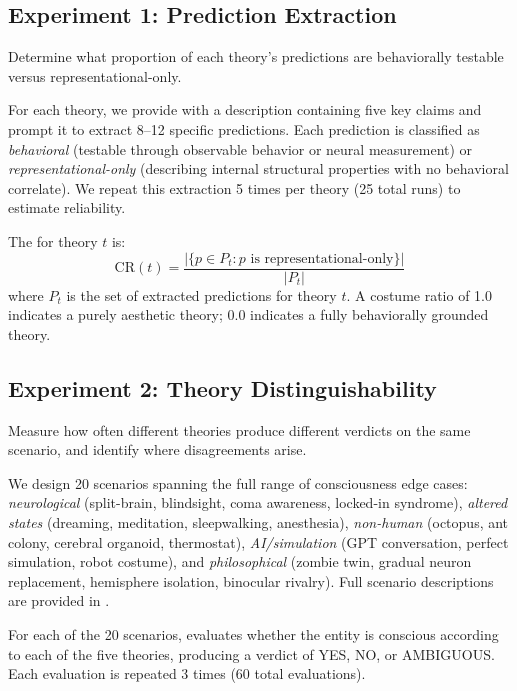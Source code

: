 \subsection{Experiment 1: Prediction Extraction}
\label{sec:exp1}

Determine what proportion of each theory's predictions are behaviorally testable versus representational-only.

For each theory, we provide \gptmodel with a description containing five key claims and prompt it to extract 8--12 specific predictions.
Each prediction is classified as \emph{behavioral} (testable through observable behavior or neural measurement) or \emph{representational-only} (describing internal structural properties with no behavioral correlate).
We repeat this extraction 5 times per theory (25 total runs) to estimate reliability.

The \costumeratio for theory $t$ is:
\begin{equation}
    \text{CR}(t) = \frac{|\{p \in P_t : p \text{ is representational-only}\}|}{|P_t|}
    \label{eq:costume_ratio}
\end{equation}
where $P_t$ is the set of extracted predictions for theory $t$.
A costume ratio of 1.0 indicates a purely aesthetic theory; 0.0 indicates a fully behaviorally grounded theory.

\subsection{Experiment 2: Theory Distinguishability}
\label{sec:exp2}

Measure how often different theories produce different verdicts on the same scenario, and identify where disagreements arise.

We design 20 scenarios spanning the full range of consciousness edge cases:
\emph{neurological} (split-brain, blindsight, coma awareness, locked-in syndrome),
\emph{altered states} (dreaming, meditation, sleepwalking, anesthesia),
\emph{non-human} (octopus, ant colony, cerebral organoid, thermostat),
\emph{AI/simulation} (GPT conversation, perfect simulation, robot costume), and
\emph{philosophical} (zombie twin, gradual neuron replacement, hemisphere isolation, binocular rivalry).
Full scenario descriptions are provided in .

For each of the 20 scenarios, \gptmodel evaluates whether the entity is conscious according to each of the five theories, producing a verdict of YES, NO, or AMBIGUOUS.
Each evaluation is repeated 3 times (60 total evaluations).

